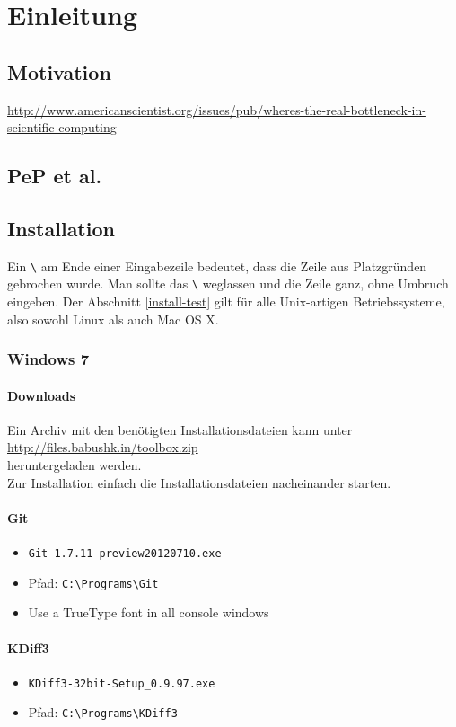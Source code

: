 \chapter{Einleitung}
\section{Motivation}
\url{http://www.americanscientist.org/issues/pub/wheres-the-real-bottleneck-in-scientific-computing}
\section{PeP et al.}

\section{Installation}
Ein \verb|\| am Ende einer Eingabezeile bedeutet, dass die Zeile aus Platzgründen gebrochen wurde.
Man sollte das \verb|\| weglassen und die Zeile ganz, ohne Umbruch eingeben.
Der Abschnitt \ref{install-test} gilt für alle Unix-artigen Betriebssysteme, also sowohl Linux als auch Mac OS X.
\subsection{Windows 7}
\subsubsection{Downloads}
Ein Archiv mit den benötigten Installationsdateien kann unter \\
\url{http://files.babushk.in/toolbox.zip} \\
heruntergeladen werden. \\
Zur Installation einfach die Installationsdateien nacheinander starten.

\subsubsection{Git}
\begin{itemize}
  \item \texttt{Git-1.7.11-preview20120710.exe}
  \item Pfad: \verb|C:\Programs\Git|
  \item Use a TrueType font in all console windows
\end{itemize}

\subsubsection{KDiff3}
\begin{itemize}
  \item \texttt{KDiff3-32bit-Setup\_0.9.97.exe}
  \item Pfad: \verb|C:\Programs\KDiff3|
\end{itemize}

